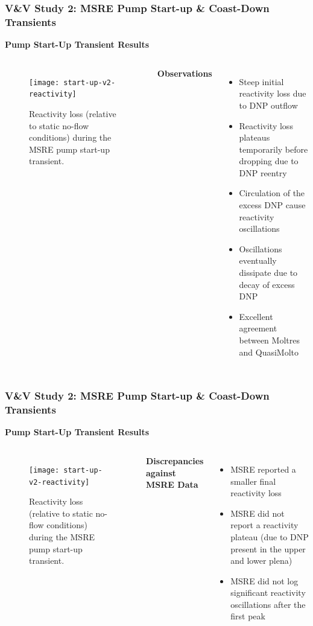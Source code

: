 \begin{frame}
  \frametitle{V\&V Study 2: MSRE Pump Start-up \& Coast-Down Transients}
  \textbf{Pump Start-Up Transient Results}
  \begin{columns}
  \column{5.5cm}
  \begin{figure}[t]
    \centering
    \texttt{[image: start-up-v2-reactivity]}
    \caption{Reactivity loss (relative to static no-flow conditions) during the \gls{MSRE} pump
    start-up transient.}
    \label{fig:start-up-reactivity}
  \end{figure}
  \column{5.5cm}
  \textbf{Observations}
  \begin{itemize}
    \item Steep initial reactivity loss due to DNP outflow
    \item Reactivity loss plateaus temporarily before dropping due to DNP reentry
    \item Circulation of the excess DNP cause reactivity oscillations
    \item Oscillations eventually dissipate due to decay of excess DNP
    \item Excellent agreement between Moltres and QuasiMolto
  \end{itemize}
  \end{columns}
\end{frame}

\begin{frame}
  \frametitle{V\&V Study 2: MSRE Pump Start-up \& Coast-Down Transients}
  \textbf{Pump Start-Up Transient Results}
  \begin{columns}
  \column{5.5cm}
  \begin{figure}[t]
    \centering
    \texttt{[image: start-up-v2-reactivity]}
    \caption{Reactivity loss (relative to static no-flow conditions) during the \gls{MSRE} pump
    start-up transient.}
    \label{fig:start-up-reactivity}
  \end{figure}
  \column{5.5cm}
  \textbf{Discrepancies against MSRE Data}
  \begin{itemize}
    \item MSRE reported a smaller final reactivity loss
    \item MSRE did not report a reactivity plateau (due to DNP present in the upper and lower plena)
    \item MSRE did not log significant reactivity oscillations after the first peak
  \end{itemize}
  \end{columns}
\end{frame}

